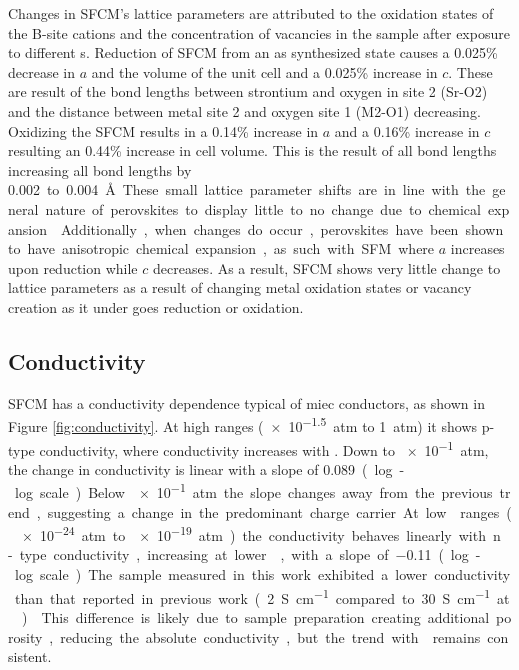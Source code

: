    Changes in SFCM's lattice parameters are attributed to the oxidation states of the B-site cations and the concentration of vacancies in the sample after exposure to different s.
    Reduction of SFCM from an as synthesized state causes a 0.025\% decrease in $a$ and the volume of the unit cell and a 0.025\% increase in $c$.
    These are result of the bond lengths between strontium and oxygen in site 2 (Sr-O2) and the distance between metal site 2 and oxygen site 1 (M2-O1) decreasing. %
    Oxidizing the SFCM results in a 0.14\% increase in $a$ and a 0.16\% increase in $c$ resulting an 0.44\% increase in cell volume.
    This is the result of all bond lengths increasing all bond lengths by \SI{0.002} to \SI{0.004}{\angstrom}.
    These small lattice parameter shifts are in line with the general nature of perovskites to display little to no change due to chemical expansion.\cite{Bishop2014}
    Additionally, when changes do occur, perovskites have been shown to have anisotropic chemical expansion, as such with SFM where $a$ increases upon reduction while $c$ decreases.\cite{Tsvetkov2016}
    As a result, SFCM shows very little change to lattice parameters as a result of changing metal oxidation states or vacancy creation as it under goes reduction or oxidation.

    \subsection{Conductivity}
    SFCM has a conductivity dependence typical of \gls{miec} conductors, as shown in Figure \ref{fig:conductivity}.
    At high  ranges (\SI{e-1.5}{atm} to \SI{1}{atm}) it shows p-type conductivity, where conductivity increases with .
    Down to \SI{e-1}{atm}, the change in conductivity is linear with a slope of \SI{0.089} (log-log scale).
    Below \SI{e-1}{atm} the slope changes away from the previous trend, suggesting a change in the predominant charge carrier.
    At low  ranges (\SI{e-24}{atm} to \SI{e-19}{atm}) the conductivity behaves linearly with n-type conductivity, increasing at lower , with a slope of \SI{-0.11} (log-log scale).
    The sample measured in this work exhibited a lower conductivity than that reported in previous work (\SI{2}{S\per\centi\meter} compared to \SI{30}{S\per\centi\meter} at ).\cite{Pan}
    This difference is likely due to sample preparation creating additional porosity, reducing the absolute conductivity, but the trend with  remains consistent.

